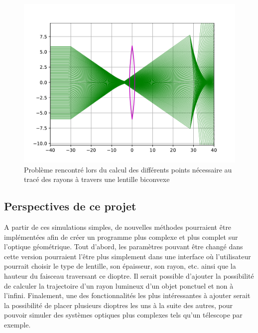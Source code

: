 \documentclass[a4paper, 11pt]{article}
\begin{document}
\begin{figure}[H]
	\centering
	\includegraphics[scale=0.6]{Figures/bug_lentille.pdf}
	\caption{Problème rencontré lors du calcul des différents points nécessaire au tracé des rayons à travers une lentille biconvexe}
	\label{fig:bug_lentille}
\end{figure}


\subsection{Perspectives de ce projet}
A partir de ces simulations simples, de nouvelles méthodes pourraient être implémentées afin de créer un programme plus complexe et plus complet sur l'optique géométrique. Tout d'abord, les paramètres pouvant être changé dans cette version pourraient l'être plus simplement dans une interface où l'utilisateur pourrait choisir le type de lentille, son épaisseur, son rayon, etc. ainsi que la hauteur du faisceau traversant ce dioptre. Il serait possible d'ajouter la possibilité de calculer la trajectoire d'un rayon lumineux d'un objet ponctuel et non à l'infini. Finalement, une des fonctionnalités les plus intéressantes à ajouter serait la possibilité de placer plusieurs dioptres les uns à la suite des autres, pour pouvoir simuler des systèmes optiques plus complexes tels qu'un télescope par exemple.

\newpage
{}
\listoffigures
\newpage


\renewcommand{\thesubsection}{\Alph{subsection}}
\appendix



\end{document}
